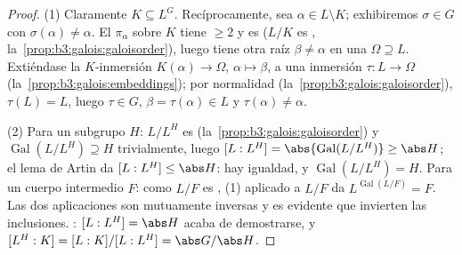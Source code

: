 \begin{proof}
(1) Claramente $K \subseteq L^G$. Recíprocamente, sea $\alpha \in L
\setminus K$; exhibiremos $\sigma \in G$ con $\sigma(\alpha) \ne
\alpha$. El 
$\pi_\alpha$ sobre $K$ tiene 
$\geq 2$ y es  ($L/K$ es
,
la~\cref{prop:b3:galois:galoisorder}), luego tiene otra raíz
$\beta \neq \alpha$ en una  $\Omega \supseteq L$. Extiéndase la $K$-inmersión
$K(\alpha) \to \Omega$, $\alpha \mapsto
\beta$, a una inmersión $\tau\colon L \to \Omega$
(la~\cref{prop:b3:galois:embeddings}); por normalidad
(la~\cref{prop:b3:galois:galoisorder}), $\tau(L) = L$, luego $\tau \in
G$, $\beta = \tau(\alpha) \in L$ y $\tau(\alpha) \neq
\alpha$.

(2) Para un subgrupo $H$: $L/L^H$ es  (la~\cref{prop:b3:galois:galoisorder}) y
$\operatorname{Gal}(L/L^H) \supseteq H$ trivialmente, luego $[L:L^H] =
\abs{\operatorname{Gal}(L/L^H)} \geq \abs H$; el lema de Artin da
$[L:L^H] \leq \abs H$: hay igualdad, y $\operatorname{Gal}(L/L^H) = H$.
Para un cuerpo intermedio $F$: como $L/F$ es
, (1) aplicado a $L/F$ da
$L^{\operatorname{Gal}(L/F)} = F$. Las dos aplicaciones son mutuamente
inversas y es evidente que invierten las inclusiones.
: $[L:L^H] = \abs H$ acaba de
demostrarse, y $[L^H:K] = [L:K]/[L:L^H] = \abs G/\abs H$.


\end{proof}
